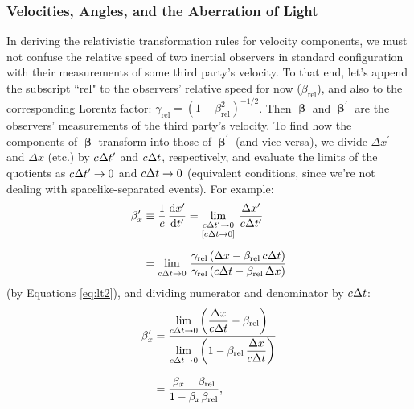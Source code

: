 \documentclass[12pt]{article}
\newcommand{\dd}[1]{\mathrm{d}#1}
\newcommand{\vvbeta}{\bm{\upbeta}}
\begin{document}
\subsubsection{Velocities, Angles, and the Aberration of Light}\label{sssec:va}
In deriving the relativistic transformation rules for velocity components, we must not confuse the relative speed of two inertial observers in standard configuration with their measurements of some third party's velocity. To that end, let's append the subscript ``rel" to the observers' relative speed for now ($\beta_{\textrm{rel}}$), and also to the corresponding Lorentz factor: $\gamma_{\textrm{rel}} = (1 - \beta_{\textrm{rel}}^2)^{-1/2}$. Then $\vvbeta$ and $\vvbeta^{\prime}$ are the observers' measurements of the third party's velocity. To find how the components of $\vvbeta$ transform into those of $\vvbeta^{\prime}$ (and vice versa), we divide $\Delta x^\prime$ and $\Delta x$ (etc.) by $c \mkern.5mu \Delta t^\prime$ and $c \mkern.5mu \Delta t$, respectively, and evaluate the limits of the quotients as $c \mkern.5mu \Delta t^\prime \rightarrow 0$ and $c \mkern.5mu \Delta t \rightarrow 0$ (equivalent conditions, since we're not dealing with spacelike-separated events). For example:
\begin{equation*}
\begin{aligned}
\beta_x^\prime &\equiv \dfrac{1}{c} \, \dfrac{\dd x^\prime}{\dd t^\prime} = \lim_{\substack{c \mkern.5mu \Delta t^\prime \to 0 \\[1.5pt] [c \mkern.5mu \Delta t \to 0]}} \, \frac{\Delta x^\prime}{c \mkern.5mu \Delta t^\prime}\\[6pt]
&= \lim_{\substack{\\ c \mkern.5mu \Delta t \to 0}} \, \frac{\gamma_{\textrm{rel}} \left( \Delta x - \beta_{\textrm{rel}} \, c \mkern.5mu \Delta t \right)}{\gamma_{\textrm{rel}} \left( c \mkern.5mu \Delta t - \beta_{\textrm{rel}} \, \Delta x \right)}
\end{aligned}
\end{equation*}
(by Equations \ref{eq:lt2}), and dividing numerator and denominator by $c \mkern.5mu \Delta t$:
\begin{equation*}
\begin{aligned}
\beta_x^\prime &= \frac{\lim\limits_{\substack{\\ c \mkern.5mu \Delta t \to 0}} \left( \dfrac{\Delta x}{c \mkern.5mu \Delta t} - \beta_{\textrm{rel}} \right) \hfill}{\lim\limits_{\substack{\\ c \mkern.5mu \Delta t \to 0}} \left( 1 - \beta_{\textrm{rel}} \, \dfrac{\Delta x}{c \mkern.5mu \Delta t} \right) }\\[7pt]
&= \frac{\beta_x - \beta_{\textrm{rel}}}{1 - \beta_{x} \mkern1mu \beta_{\textrm{rel}}},
\end{aligned}
\end{equation*}
\end{document}
